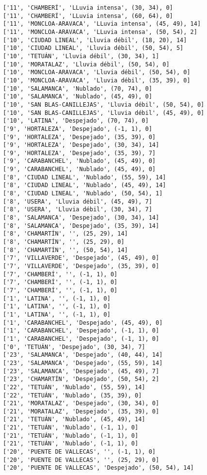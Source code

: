 \documentclass[11pt]{article}
\begin{document}
\begin{Verbatim}[commandchars=\\\{\}]
['11', 'CHAMBERÍ', 'LLuvia intensa', (30, 34), 0]
['11', 'CHAMBERÍ', 'LLuvia intensa', (60, 64), 0]
['11', 'MONCLOA-ARAVACA', 'LLuvia intensa', (45, 49), 14]
['11', 'MONCLOA-ARAVACA', 'LLuvia intensa', (50, 54), 2]
['10', 'CIUDAD LINEAL', 'Lluvia débil', (18, 20), 14]
['10', 'CIUDAD LINEAL', 'Lluvia débil', (50, 54), 5]
['10', 'TETUÁN', 'Lluvia débil', (30, 34), 1]
['10', 'MORATALAZ', 'Lluvia débil', (50, 54), 0]
['10', 'MONCLOA-ARAVACA', 'Lluvia débil', (50, 54), 0]
['10', 'MONCLOA-ARAVACA', 'Lluvia débil', (35, 39), 0]
['10', 'SALAMANCA', 'Nublado', (70, 74), 0]
['10', 'SALAMANCA', 'Nublado', (45, 49), 0]
['10', 'SAN BLAS-CANILLEJAS', 'Lluvia débil', (50, 54), 0]
['10', 'SAN BLAS-CANILLEJAS', 'Lluvia débil', (45, 49), 0]
['10', 'LATINA', 'Despejado', (70, 74), 0]
['9', 'HORTALEZA', 'Despejado', (-1, 1), 0]
['9', 'HORTALEZA', 'Despejado', (35, 39), 0]
['9', 'HORTALEZA', 'Despejado', (30, 34), 14]
['9', 'HORTALEZA', 'Despejado', (35, 39), 7]
['9', 'CARABANCHEL', 'Nublado', (45, 49), 0]
['9', 'CARABANCHEL', 'Nublado', (45, 49), 0]
['8', 'CIUDAD LINEAL', 'Nublado', (55, 59), 14]
['8', 'CIUDAD LINEAL', 'Nublado', (45, 49), 14]
['8', 'CIUDAD LINEAL', 'Nublado', (50, 54), 1]
['8', 'USERA', 'Lluvia débil', (45, 49), 7]
['8', 'USERA', 'Lluvia débil', (30, 34), 7]
['8', 'SALAMANCA', 'Despejado', (30, 34), 14]
['8', 'SALAMANCA', 'Despejado', (35, 39), 14]
['8', 'CHAMARTÍN', '', (25, 29), 14]
['8', 'CHAMARTÍN', '', (25, 29), 0]
['8', 'CHAMARTÍN', '', (50, 54), 14]
['7', 'VILLAVERDE', 'Despejado', (45, 49), 0]
['7', 'VILLAVERDE', 'Despejado', (35, 39), 0]
['7', 'CHAMBERÍ', '', (-1, 1), 0]
['7', 'CHAMBERÍ', '', (-1, 1), 0]
['7', 'CHAMBERÍ', '', (-1, 1), 0]
['1', 'LATINA', '', (-1, 1), 0]
['1', 'LATINA', '', (-1, 1), 0]
['1', 'LATINA', '', (-1, 1), 0]
['1', 'CARABANCHEL', 'Despejado', (45, 49), 0]
['1', 'CARABANCHEL', 'Despejado', (-1, 1), 0]
['1', 'CARABANCHEL', 'Despejado', (-1, 1), 0]
['0', 'TETUÁN', 'Despejado', (30, 34), 7]
['23', 'SALAMANCA', 'Despejado', (40, 44), 14]
['23', 'SALAMANCA', 'Despejado', (55, 59), 14]
['23', 'SALAMANCA', 'Despejado', (45, 49), 7]
['23', 'CHAMARTÍN', 'Despejado', (50, 54), 2]
['22', 'TETUÁN', 'Nublado', (55, 59), 14]
['22', 'TETUÁN', 'Nublado', (35, 39), 0]
['21', 'MORATALAZ', 'Despejado', (30, 34), 0]
['21', 'MORATALAZ', 'Despejado', (35, 39), 0]
['21', 'TETUÁN', 'Nublado', (45, 49), 14]
['21', 'TETUÁN', 'Nublado', (-1, 1), 0]
['21', 'TETUÁN', 'Nublado', (-1, 1), 0]
['21', 'TETUÁN', 'Nublado', (-1, 1), 0]
['20', 'PUENTE DE VALLECAS', '', (-1, 1), 0]
['20', 'PUENTE DE VALLECAS', '', (25, 29), 0]
['20', 'PUENTE DE VALLECAS', 'Despejado', (50, 54), 14]

\end{Verbatim}
\end{document}
